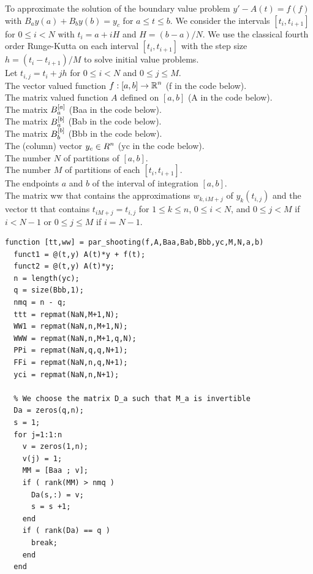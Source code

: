 \begin{code} \label{parShootCode}
To approximate the solution of the boundary value problem
$y' - A(t) = f(f)$ with $B_a y(a) + B_b y(b) = y_c$  for $a \leq t \leq b$.
We consider the intervals $[t_i,t_{i+1}]$ for $0 \leq i < N$ with
$t_i = a + i H$ and $H = (b-a)/N$.  We use the classical fourth order
Runge-Kutta on each interval $[t_i,t_{i+1}]$ with the step size
$h = (t_i - t_{i+1})/M$ to solve initial value problems.\\
Let $t_{i,j} = t_i + j h$ for $0\leq i < N$ and $0 \leq j \leq M$.\\
 The vector valued function
$\displaystyle f:[a,b] \to \mathbb{R}^n$ (f in the code below).\\
The \nn matrix valued function $A$ defined on $[a,b]$ (A in the code
below).\\
The  matrix $\displaystyle B_a^{[a]}$ (Baa in the code below).\\
The  matrix $\displaystyle B_a^{[b]}$ (Bab in the code below).\\
The  matrix $\displaystyle B_b^{[b]}$ (Bbb in the code below).\\
The (column) vector $\displaystyle y_c \in R^n$ (yc in the code below).\\
The number $N$ of partitions of $[a,b]$.\\
The number $M$ of partitions of each $[t_i,t_{i+1}]$.\\
The endpoints $a$ and $b$ of the interval of integration $[a,b]$.\\
 The  matrix ww that contains the approximations
$w_{k,iM+j}$ of $y_k(t_{i,j})$ and the vector tt that contains
$t_{iM+j} = t_{i,j}$ for $1 \leq k \leq n$, $0 \leq i < N$, and
$0 \leq j < M$ if $i<N-1$ or $0 \leq j \leq M$ if $i=N-1$.  
\small
\begin{verbatim}
function [tt,ww] = par_shooting(f,A,Baa,Bab,Bbb,yc,M,N,a,b)
  funct1 = @(t,y) A(t)*y + f(t);
  funct2 = @(t,y) A(t)*y;
  n = length(yc);
  q = size(Bbb,1);
  nmq = n - q;
  ttt = repmat(NaN,M+1,N);
  WW1 = repmat(NaN,n,M+1,N);
  WWW = repmat(NaN,n,M+1,q,N);
  PPi = repmat(NaN,q,q,N+1);
  FFi = repmat(NaN,n,q,N+1);
  yci = repmat(NaN,n,N+1);
    
  % We choose the matrix D_a such that M_a is invertible
  Da = zeros(q,n);
  s = 1;
  for j=1:1:n
    v = zeros(1,n);
    v(j) = 1;
    MM = [Baa ; v];
    if ( rank(MM) > nmq )
      Da(s,:) = v;
      s = s +1;
    end
    if ( rank(Da) == q )
      break;
    end
  end


\end{verbatim}
\end{code}
